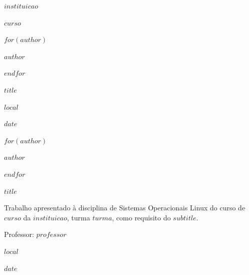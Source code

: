 \begin{titlepage}
\thispagestyle{empty}
\centering
{\bfseries\MakeUppercase{$instituicao$}\par}
\vspace{0.3cm}
{\MakeUppercase{$curso$}\par}
\vspace{2.2cm}
$for(author)$
{\MakeUppercase{$author$}\par}
$endfor$
\vfill
{\bfseries\MakeUppercase{$title$}\par}
\vfill
{$local$\par}
{$date$\par}
\end{titlepage}

\begin{titlepage}
\thispagestyle{empty}
\centering
$for(author)$
{\MakeUppercase{$author$}\par}
$endfor$
\vspace{4cm}
{\bfseries\MakeUppercase{$title$}\par}
\vspace{2.5cm}
\hfill\begin{minipage}{0.55\textwidth}
\singlespacing\small
Trabalho apresentado à disciplina de Sistemas Operacionais Linux do curso de $curso$ da $instituicao$, turma $turma$, como requisito do $subtitle$.

\vspace{0.4cm}
Professor: $professor$
\end{minipage}
\vfill
{$local$\par}
{$date$\par}
\end{titlepage}
\setcounter{page}{2}
